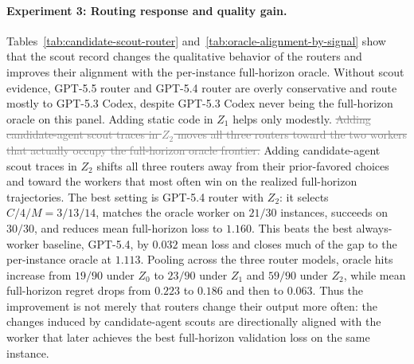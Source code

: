 \documentclass{article}
\newcommand{\oldtext}[1]{\textcolor{gray}{\sout{#1}}}
\newcommand{\newtext}[1]{\textcolor{green!50!black}{#1}}
\begin{document}
\paragraph{Experiment 3: Routing response and quality gain.}
Tables~\ref{tab:candidate-scout-router} and~\ref{tab:oracle-alignment-by-signal} show that the scout record changes the qualitative behavior of the routers and improves their alignment with the per-instance full-horizon oracle.
Without scout evidence, GPT-5.5 router and GPT-5.4 router are overly conservative and route mostly to GPT-5.3 Codex, despite GPT-5.3 Codex never being the full-horizon oracle on this panel.
Adding static code in \(Z_1\) helps only modestly.
\oldtext{Adding candidate-agent scout traces in \(Z_2\) moves all three routers toward the two workers that actually occupy the full-horizon oracle frontier.}
\newtext{Adding candidate-agent scout traces in \(Z_2\) shifts all three routers away from their prior-favored choices and toward the workers that most often win on the realized full-horizon trajectories.}
The best setting is GPT-5.4 router with \(Z_2\): it selects \(C/4/M=3/13/14\), matches the oracle worker on \(21/30\) instances, succeeds on \(30/30\), and reduces mean full-horizon loss to \(1.160\).
This beats the best always-worker baseline, GPT-5.4, by \(0.032\) mean loss and closes much of the gap to the per-instance oracle at \(1.113\).
Pooling across the three router models, oracle hits increase from \(19/90\) under \(Z_0\) to \(23/90\) under \(Z_1\) and \(59/90\) under \(Z_2\), while mean full-horizon regret drops from \(0.223\) to \(0.186\) and then to \(0.063\).
Thus the improvement is not merely that routers change their output more often: the changes induced by candidate-agent scouts are directionally aligned with the worker that later achieves the best full-horizon validation loss on the same instance.
\end{document}
